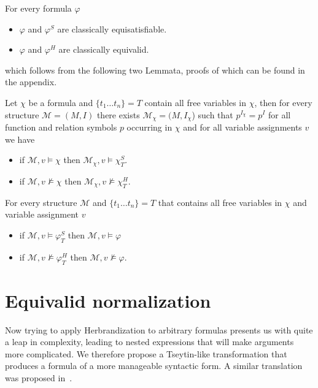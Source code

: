\documentclass[a4paper,UKenglish,cleveref, autoref, thm-restate]{lipics-v2021}
\begin{document}
\begin{theorem}For every formula $\varphi$
	\begin{itemize}
		\item $\varphi$ and $\varphi^S$ are classically equisatisfiable.
		\item $\varphi$ and $\varphi^H$ are classically equivalid.
	\end{itemize}
\end{theorem}

which follows from the following two Lemmata, proofs of which can be found in the appendix.

\begin{lemma}\label{ap1}
	Let $\chi$ be a formula and $\{t_1\dots t_n\} = T$ contain all free variables in $\chi$, then for every structure $\mathcal M = (M, I)$ there exists $\mathcal M_\chi = (M, I_\chi$) such that $p^{I_{\chi}} = p^I$ for all function and relation symbols $p$ occurring in $\chi$ and for all variable assignments $v$ we have
	\begin{itemize}
		\item if $\mathcal M, v\models\chi$ then $\mathcal M_\chi, v\models\chi^S_T$.
		\item if $\mathcal M, v\not\models\chi$ then $\mathcal M_\chi, v\not\models\chi^H_T$.
	\end{itemize}
\end{lemma}

\begin{lemma}\label{ap2}
	For every structure $\mathcal M$ and $\{t_1\dots t_n\} = T$ that contains all free variables in $\chi$ and variable assignment $v$
	\begin{itemize}
		\item if $\mathcal M, v\models\varphi^S_T$ then $\mathcal M, v\models \varphi$
		\item if $\mathcal M, v\not\models\varphi^H_T$ then $\mathcal M, v\not\models\varphi$.
	\end{itemize}
\end{lemma}



\section{Equivalid normalization}

Now trying to apply Herbrandization to arbitrary formulas presents us with quite a leap in complexity, leading to nested expressions that will make arguments more complicated. We therefore propose a Tseytin-like transformation that produces a formula of a more manageable syntactic form. A similar translation was proposed in~\cite{statman1979intuitionistic}.
\end{document}
